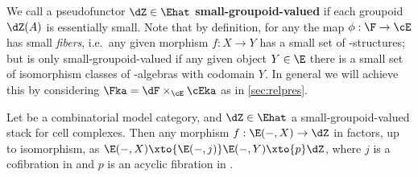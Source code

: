 We call a pseudofunctor $\dZ\in\Ehat$ \textbf{small-groupoid-valued} if each groupoid $\dZ(A)$ is essentially small.
Note that by definition, for any \nfs \F the map $\phi:\F\to\cE$ has small \emph{fibers}, i.e.\ any given morphism $f:X\to Y$ has a small set of \F-structures; but \F is only small-groupoid-valued if any given object $Y\in\E$ there is a small set of isomorphism classes of \F-algebras with codomain $Y$.
In general we will achieve this by considering $\Fka = \dF\times_\cE \cEka$ as in \cref{sec:relpres}.

\begin{thm}\label{thm:2cat-soa}
  Let \E be a combinatorial model category, and $\dZ\in\Ehat$ a small-groupoid-valued stack for cell complexes.
  Then any morphism $f:\E(-,X) \to\dZ$ in \Ehat factors, up to isomorphism, as $\E(-,X) \xto{\E(-,j)} \E(-,Y) \xto{p} \dZ$, where $j$ is a cofibration in \E and $p$ is an acyclic fibration in \Ehat.
\end{thm}
